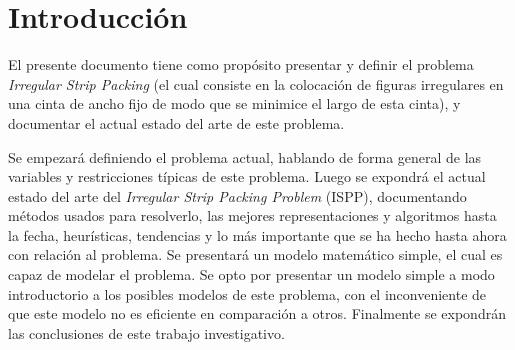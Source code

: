 \section{Introducción}

El presente documento tiene como propósito presentar y definir el problema \textit{Irregular Strip Packing} (el cual consiste en la colocación de figuras irregulares en una cinta de ancho fijo de modo que se minimice el largo de esta cinta), y documentar el actual estado del arte de este problema. 

Se empezará definiendo el problema actual, hablando de forma general de las variables y restricciones típicas de este problema. Luego se expondrá el actual estado del arte del \textit{Irregular Strip Packing Problem} (ISPP), documentando métodos usados para resolverlo, las mejores representaciones y algoritmos hasta la fecha, heurísticas, tendencias y lo más importante que se ha hecho hasta ahora con relación al problema. Se presentará un modelo matemático simple, el cual es capaz de modelar el problema. Se opto por presentar un modelo simple a modo introductorio a los posibles modelos de este problema, con el inconveniente de que este modelo no es eficiente en comparación a otros. Finalmente se expondrán las conclusiones de este trabajo investigativo.

